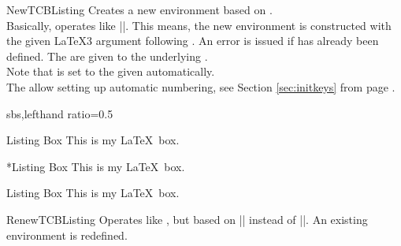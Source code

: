 

\clearpage

\begin{docCommand}{NewTCBListing}{}
  Creates a new environment  based on .\\
  Basically,  operates like |\NewDocumentEnvironment|. This means,
  the new environment  is constructed with the
  given \LaTeX3 argument  following \cite{latexproject:usrguide}.
  An error is issued if  has already been defined.
  The  are given to the underlying .\\
  Note that  is set to the given 
  automatically.\\
  The  allow setting up automatic numbering,
  see Section \ref{sec:initkeys} from page \pageref{sec:initkeys}.

\begin{dispExample*}{sbs,lefthand ratio=0.5}

\begin{mybox}{Listing Box}
This is my
\LaTeX\ box.
\end{mybox}
\bigskip

\begin{mybox}*{Listing Box}
This is my
\LaTeX\ box.
\end{mybox}
\bigskip

\begin{mybox}[colback=yellow]
  {Listing Box}
This is my
\LaTeX\ box.
\end{mybox}
\end{dispExample*}
\end{docCommand}

\begin{docCommand}{RenewTCBListing}{}
  Operates like , but based on |\RenewDocumentEnvironment| instead of |\NewDocumentEnvironment|.
  An existing environment is redefined.
\end{docCommand}


